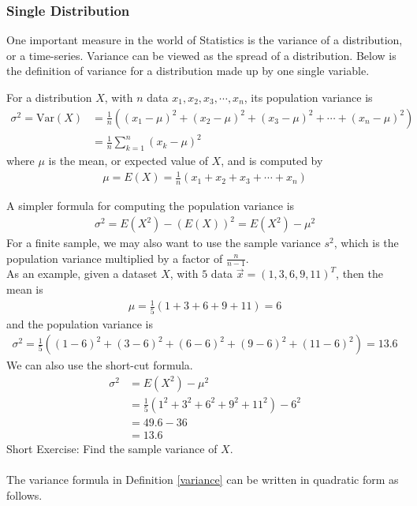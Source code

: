 \subsubsection{Single Distribution}
One important measure in the world of Statistics is the variance of a distribution, or a time-series. Variance can be viewed as the spread of a distribution. Below is the definition of variance for a distribution made up by one single variable.
\begin{defn}
\label{variance}
For a distribution $X$, with $n$ data $x_1, x_2, x_3, \cdots, x_n$, its population variance is
\begin{align*}
\sigma^2 = \text{Var}(X) &= \frac{1}{n} ((x_1 - \mu)^2 + (x_2 - \mu)^2 + (x_3 - \mu)^2 + \cdots + (x_n - \mu)^2) \\
&= \frac{1}{n} \sum_{k=1}^n (x_k - \mu)^2
\end{align*}
where $\mu$ is the mean, or expected value of $X$, and is computed by
\begin{align*}
\mu = E(X) = \frac{1}{n} (x_1 + x_2 + x_3 + \cdots + x_n)
\end{align*}
\end{defn}
A simpler formula for computing the population variance is
\begin{align*}
\sigma^2 = E(X^2) - (E(X))^2 = E(X^2) - \mu^2
\end{align*}
For a finite sample, we may also want to use the sample variance $s^2$, which is the population variance multiplied by a factor of $\frac{n}{n-1}$. \\
As an example, given a dataset $X$, with $5$ data $\vec{x} = (1, 3, 6, 9, 11)^T$, then the mean is
\begin{align*}
\mu = \frac{1}{5}(1 + 3 + 6 + 9 + 11) = 6
\end{align*}
and the population variance is
\begin{align*}
\sigma^2 = \frac{1}{5}((1-6)^2 + (3-6)^2 + (6-6)^2 + (9-6)^2 + (11-6)^2) = 13.6
\end{align*}
We can also use the short-cut formula.
\begin{align*}
\sigma^2 &= E(X^2) - \mu^2 \\
&= \frac{1}{5} (1^2 + 3^2 + 6^2 + 9^2 + 11^2) - 6^2 \\
&= 49.6 - 36 \\
&= 13.6
\end{align*}
Short Exercise: Find the sample variance of $X$.\\
\\
The variance formula in Definition \ref{variance} can be written in quadratic form as follows.
